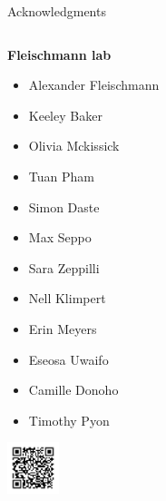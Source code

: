 \documentclass[bigger]{beamer}
\begin{document}
{%
\begin{frame}{Acknowledgments}
    \addtocounter{framenumber}{-1}
    \begin{columns}[T]
        \begin{column}{0.5\textwidth}
            \begin{tcolorbox}[opacityfill=0.1, arc=0mm, size=fbox, coltext=white, colback=black, colframe=black]
                \small
                \centering
                \textbf{Fleischmann lab}
                \begin{itemize}[noitemsep, before=\color{white}\bfseries]
                    \scriptsize
                    \item Alexander Fleischmann
                    \item Keeley Baker
                    \item Olivia Mckissick
                    \item Tuan Pham
                    \item Simon Daste
                    \item Max Seppo
                    \item Sara Zeppilli
                    \item Nell Klimpert
                    \item Erin Meyers
                    \item Eseosa Uwaifo
                    \item Camille Donoho
                    \item Timothy Pyon
                \end{itemize}
            \end{tcolorbox}
            \includegraphics[height=1.5cm]{img/qr-code.png}\\
        \end{column}


\end{columns}
\end{frame}}
\end{document}
